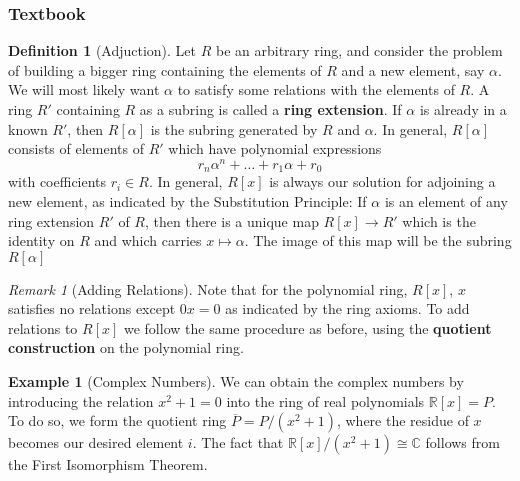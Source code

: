 \documentclass[12pt]{article}
\theoremstyle{definition}
\newtheorem{defn}[thm]{Definition}
\newtheorem{eg}[thm]{Example}
\theoremstyle{remark}
\newtheorem{rmk}[thm]{Remark}
\numberwithin{equation}{section}
\newcommand\C{\mathbb C}    %
\newcommand\R{\mathbb R}    %
\newcommand\B[1]{\textbf{ #1}}
\begin{document}
\subsubsection{Textbook}

\begin{defn}[Adjuction]
        Let $R$ be an arbitrary ring, and consider the problem of building a bigger ring containing the elements of $R$ and a new element, say $\alpha$. We will most likely want $\alpha$ to satisfy some relations with the elements of $R$. A ring $R'$ containing $R$ as a subring is called a \B{ring extension}. If $\alpha$ is already in a known $R'$, then $R[\alpha]$ is the subring generated by $R$ and $\alpha$. In general, $R[\alpha]$ consists of elements of $R'$ which have polynomial expressions\begin{equation}
                r_n\alpha^n+\hdots + r_1\alpha + r_0
        \end{equation}
        with coefficients $r_i \in R$. In general, $R[x]$ is always our solution for adjoining a new element, as indicated by the Substitution Principle: If $\alpha$ is an element of any ring extension $R'$ of $R$, then there is a unique map $R[x] \rightarrow R'$ which is the identity on $R$ and which carries $x \mapsto \alpha$. The image of this map will be the subring $R[\alpha]$
\end{defn}


\vspace{15pt}

\begin{rmk}[Adding Relations]
        Note that for the polynomial ring, $R[x]$, $x$ satisfies no relations except $0x = 0$ as indicated by the ring axioms. To add relations to $R[x]$ we follow the same procedure as before, using the \B{quotient construction} on the polynomial ring. 
\end{rmk}

\vspace{15pt}

\begin{eg}[Complex Numbers]
        We can obtain the complex numbers by introducing the relation $x^2 + 1 = 0$ into the ring of real polynomials $\R[x]=P$. To do so, we form the quotient ring $\overline{P}=P/(x^2+1)$, where the residue of $x$ becomes our desired element $i$. The fact that $\R[x]/(x^2+1) \cong \C$ follows from the First Isomorphism Theorem.
\end{eg}

\vspace{15pt}
\end{document}
